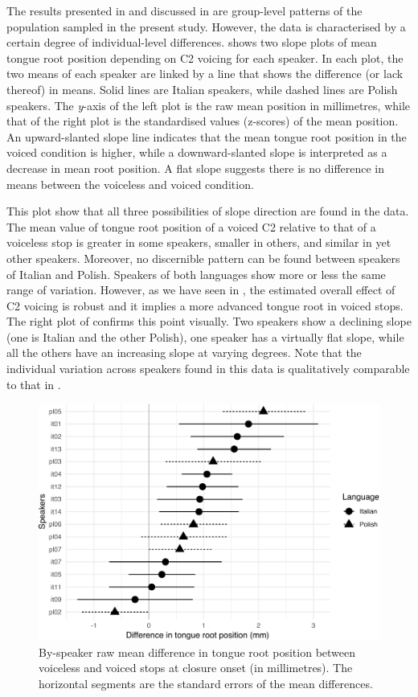 \documentclass[
  12pt,
]{article}
\begin{document}
The results presented in  and discussed in
 are group-level patterns of the population sampled
in the present study. However, the data is characterised by a certain
degree of individual-level differences.  shows
two slope plots of mean tongue root position depending on C2 voicing for
each speaker. In each plot, the two means of each speaker are linked by
a line that shows the difference (or lack thereof) in means. Solid lines
are Italian speakers, while dashed lines are Polish speakers. The
\emph{y}-axis of the left plot is the raw mean position in millimetres,
while that of the right plot is the standardised values (z-scores) of
the mean position. An upward-slanted slope line indicates that the mean
tongue root position in the voiced condition is higher, while a
downward-slanted slope is interpreted as a decrease in mean root
position. A flat slope suggests there is no difference in means between
the voiceless and voiced condition.

This plot show that all three possibilities of slope direction are found
in the data. The mean value of tongue root position of a voiced C2
relative to that of a voiceless stop is greater in some speakers,
smaller in others, and similar in yet other speakers. Moreover, no
discernible pattern can be found between speakers of Italian and Polish.
Speakers of both languages show more or less the same range of
variation. However, as we have seen in , the estimated
overall effect of C2 voicing is robust and it implies a more advanced
tongue root in voiced stops. The right plot of 
confirms this point visually. Two speakers show a declining slope (one
is Italian and the other Polish), one speaker has a virtually flat
slope, while all the others have an increasing slope at varying degrees.
Note that the individual variation across speakers found in this data is
qualitatively comparable to that in \citet{ahn2018}.

\begin{figure}
\includegraphics[width=\linewidth]{2018-tra_files/figure-latex/trp-difference-1} \caption{By-speaker raw mean difference in tongue root position between voiceless and voiced stops at closure onset (in millimetres). The horizontal segments are the standard errors of the mean differences.}\label{f:trp-difference}
\end{figure}
\end{document}
